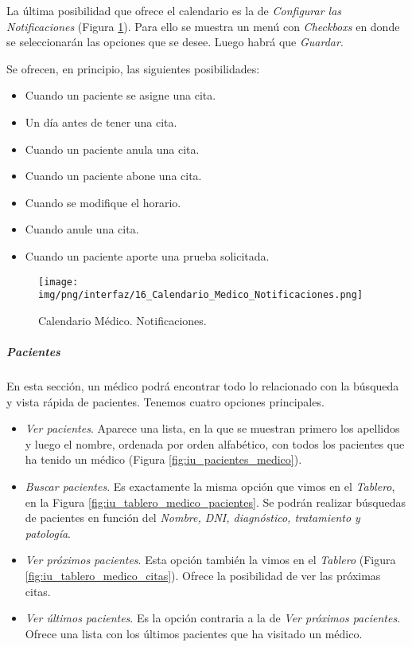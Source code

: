 \documentclass[a4paper,oneside,11pt]{book}
\begin{document}
			La última posibilidad que ofrece el calendario es la de \textit{Configurar las Notificaciones} (Figura \ref{fig:iu_calendario_notificaciones}). Para ello se muestra un menú con \textit{Checkboxs} en donde se seleccionarán las opciones que se desee. Luego habrá que \textit{Guardar}. 
			
			Se ofrecen, en principio, las siguientes posibilidades:
			\begin{itemize}
				\item Cuando un paciente se asigne una cita.
				\item Un día antes de tener una cita.
				\item Cuando un paciente anula una cita.
				\item Cuando un paciente abone una cita.
				\item Cuando se modifique el horario.
				\item Cuando anule una cita.
				\item Cuando un paciente aporte una prueba solicitada.
			\end{itemize}
			
			
			\begin{figure}[H]
			  \centering
			    \texttt{[image: img/png/interfaz/16\_Calendario\_Medico\_Notificaciones.png]}
			  \caption{Calendario Médico. Notificaciones.}
			  \label{fig:iu_calendario_notificaciones}
			\end{figure}
			
			
		
		
		\subparagraph{Pacientes} %
		\label{par:medico_pacientes}
		
		En esta sección, un médico podrá encontrar todo lo relacionado con la búsqueda y vista rápida de pacientes.	Tenemos cuatro opciones principales.
		
		\begin{itemize}
			\item \textit{Ver pacientes}. Aparece una lista, en la que se muestran primero los apellidos y luego el nombre, ordenada por orden alfabético, con todos los pacientes que ha tenido un médico (Figura \ref{fig:iu_pacientes_medico}).
			\item \textit{Buscar pacientes}. Es exactamente la misma opción que vimos en el \textit{Tablero}, en la Figura \ref{fig:iu_tablero_medico_pacientes}. Se podrán realizar búsquedas de pacientes en función del \textit{Nombre, DNI, diagnóstico, tratamiento y patología}.
			\item \textit{Ver próximos pacientes}. Esta opción también la vimos en el \textit{Tablero} (Figura \ref{fig:iu_tablero_medico_citas}). Ofrece la posibilidad de ver las próximas citas.
			\item \textit{Ver últimos pacientes}. Es la opción contraria a la de \textit{Ver próximos pacientes}. Ofrece una lista con los últimos pacientes que ha visitado un médico. 
		\end{itemize}
			
\end{document}
